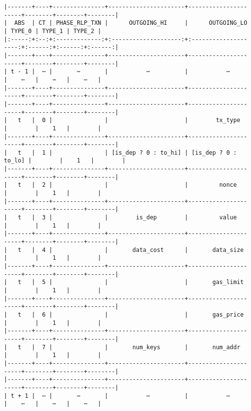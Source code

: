 \documentclass[varwidth=\maxdimen,margin=0.5cm,multi={verbatim}]{standalone}
\begin{document}
\begin{verbatim}
|-------+----+---------------+----------------------+----------------------+--------+--------+--------|
|  ABS  | CT | PHASE_RLP_TXN |      OUTGOING_HI     |      OUTGOING_LO     | TYPE_0 | TYPE_1 | TYPE_2 |
|:-----:+:--:+:-------------:+:--------------------:+:--------------------:+:------:+:------:+:------:|
|-------+----+---------------+----------------------+----------------------+--------+--------+--------|
| t - 1 |  ⋯ |       ⋯       |           ⋯          |           ⋯          |    ⋯   |    ⋯   |    ⋯   |
|-------+----+---------------+----------------------+----------------------+--------+--------+--------|
|-------+----+---------------+----------------------+----------------------+--------+--------+--------|
|   t   |  0 |               |                      |        tx_type       |        |    1   |        |
|-------+----+---------------+----------------------+----------------------+--------+--------+--------|
|   t   |  1 |               | [is_dep ? 0 : to_hi] | [is_dep ? 0 : to_lo] |        |    1   |        |
|-------+----+---------------+----------------------+----------------------+--------+--------+--------|
|   t   |  2 |               |                      |         nonce        |        |    1   |        |
|-------+----+---------------+----------------------+----------------------+--------+--------+--------|
|   t   |  3 |               |        is_dep        |         value        |        |    1   |        |
|-------+----+---------------+----------------------+----------------------+--------+--------+--------|
|   t   |  4 |               |       data_cost      |       data_size      |        |    1   |        |
|-------+----+---------------+----------------------+----------------------+--------+--------+--------|
|   t   |  5 |               |                      |       gas_limit      |        |    1   |        |
|-------+----+---------------+----------------------+----------------------+--------+--------+--------|
|   t   |  6 |               |                      |       gas_price      |        |    1   |        |
|-------+----+---------------+----------------------+----------------------+--------+--------+--------|
|   t   |  7 |               |       num_keys       |       num_addr       |        |    1   |        |
|-------+----+---------------+----------------------+----------------------+--------+--------+--------|
|-------+----+---------------+----------------------+----------------------+--------+--------+--------|
| t + 1 |  ⋯ |       ⋯       |           ⋯          |           ⋯          |    ⋯   |    ⋯   |    ⋯   |




\end{verbatim}
\end{document}
